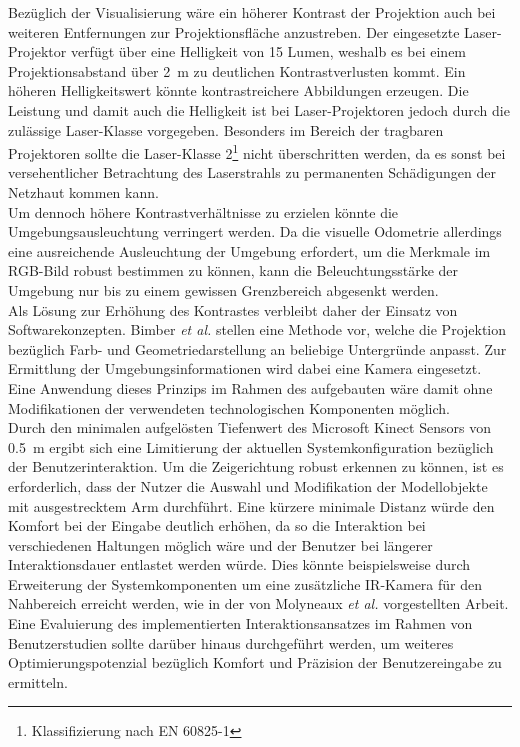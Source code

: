 Bezüglich der Visualisierung wäre ein höherer Kontrast der Projektion auch bei weiteren Entfernungen zur Projektionsfläche anzustreben. Der eingesetzte Laser-Projektor verfügt über eine Helligkeit von 15 Lumen, weshalb es bei einem Projektionsabstand über \SI{2}{\meter} zu deutlichen Kontrastverlusten kommt. Ein höheren Helligkeitswert könnte kontrastreichere Abbildungen erzeugen. Die Leistung und damit auch die Helligkeit ist bei Laser-Projektoren jedoch durch die zulässige Laser-Klasse vorgegeben. Besonders im Bereich der tragbaren Projektoren sollte die Laser-Klasse 2\footnote{Klassifizierung nach EN 60825-1} nicht überschritten werden, da es sonst bei versehentlicher Betrachtung des Laserstrahls zu permanenten Schädigungen der Netzhaut kommen kann.\\
Um dennoch höhere Kontrastverhältnisse zu erzielen könnte die Umgebungsausleuchtung verringert werden. Da die visuelle Odometrie allerdings eine ausreichende Ausleuchtung der Umgebung erfordert, um die Merkmale im RGB-Bild robust bestimmen zu können, kann die Beleuchtungsstärke der Umgebung nur bis zu einem gewissen Grenzbereich abgesenkt werden.\\
Als Lösung zur Erhöhung des Kontrastes verbleibt daher der Einsatz von Softwarekonzepten. Bimber \textit{et al.} stellen eine Methode vor, welche die Projektion bezüglich Farb- und Geometriedarstellung an beliebige Untergründe anpasst. Zur Ermittlung der Umgebungsinformationen wird dabei eine Kamera eingesetzt. Eine Anwendung dieses Prinzips im Rahmen des aufgebauten  wäre damit ohne Modifikationen der verwendeten technologischen Komponenten möglich.\\

Durch den minimalen aufgelösten Tiefenwert des Microsoft Kinect Sensors von \SI{0,5}{\meter} ergibt sich eine Limitierung der aktuellen Systemkonfiguration bezüglich der Benutzerinteraktion. Um die Zeigerichtung robust erkennen zu können, ist es erforderlich, dass der Nutzer die Auswahl und Modifikation der Modellobjekte mit ausgestrecktem Arm durchführt. Eine kürzere minimale Distanz würde den Komfort bei der Eingabe deutlich erhöhen, da so die Interaktion bei verschiedenen Haltungen möglich wäre und der Benutzer bei längerer Interaktionsdauer entlastet werden würde. Dies könnte beispielsweise durch Erweiterung der Systemkomponenten um eine zusätzliche IR-Kamera für den Nahbereich erreicht werden, wie in der von Molyneaux \textit{et al.} \cite{Molyneaux2012} vorgestellten Arbeit.\\
Eine Evaluierung des implementierten Interaktionsansatzes im Rahmen von Benutzerstudien sollte darüber hinaus durchgeführt werden, um weiteres Optimierungspotenzial bezüglich Komfort und Präzision der Benutzereingabe zu ermitteln.\\

